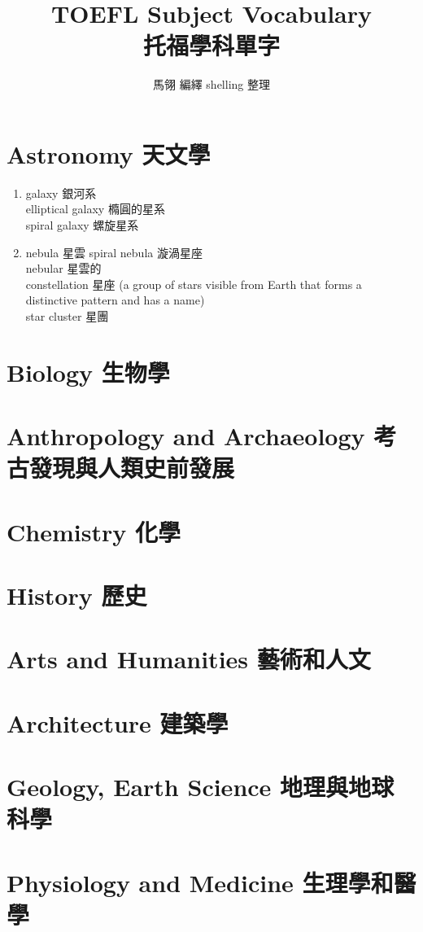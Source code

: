 \documentclass[twoside,b5paper]{book}
\begin{document}
  \title{TOEFL Subject Vocabulary\\ 托福學科單字}
  \author{馬翎 編繹 shelling 整理}
  \maketitle

  \tableofcontents %

  \chapter{Astronomy \kai 天文學}
  \begin{enumerate}
    \item galaxy 銀河系\\
      elliptical galaxy 橢圓的星系\\
      spiral galaxy 螺旋星系
    \item nebula 星雲 spiral nebula 漩渦星座\\
      nebular 星雲的\\
      constellation 星座 (a group of stars visible from Earth that forms a distinctive pattern and has a name)\\
      star cluster 星團
  \end{enumerate}


  \chapter{Biology \kai 生物學}

  \chapter{Anthropology and Archaeology \kai 考古發現與人類史前發展}

  \chapter{Chemistry \kai 化學}

  \chapter{History \kai 歷史}

  \chapter{Arts and Humanities \kai 藝術和人文}

  \chapter{Architecture \kai 建築學}

  \chapter{Geology, Earth Science \kai 地理與地球科學}

  \chapter{Physiology and Medicine \kai 生理學和醫學}
\end{document}

